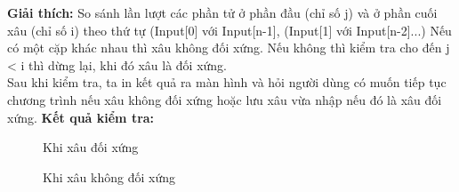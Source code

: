 \documentclass[a4paper,12pt]{article}
\begin{document}
\textbf{Giải thích: } 
So sánh lần lượt các phần tử ở phần đầu (chỉ số j) và ở phần cuối xâu (chỉ số i) theo thứ tự (Input[0] với Input[n-1], (Input[1] với Input[n-2]...) Nếu có một cặp khác nhau thì xâu không đối xứng. Nếu không thì kiểm tra cho đến j < i thì dừng lại, khi đó xâu là đối xứng.  \\
Sau khi kiểm tra, ta in kết quả ra màn hình và hỏi người dùng có muốn tiếp tục chương trình nếu xâu không đối xứng hoặc lưu xâu vừa nhập nếu đó là xâu đối xứng.
\clearpage
\noindent
\textbf{Kết quả kiểm tra:}
\begin{figure}[!h]
	\centerline{}
	\caption{Khi xâu đối xứng}
	\label{fig:bai6}
\end{figure}
\begin{figure}[!h]
	\centerline{}
	\caption{Khi xâu không đối xứng}
	\label{fig:bai6}
\end{figure}
\clearpage
\end{document}
